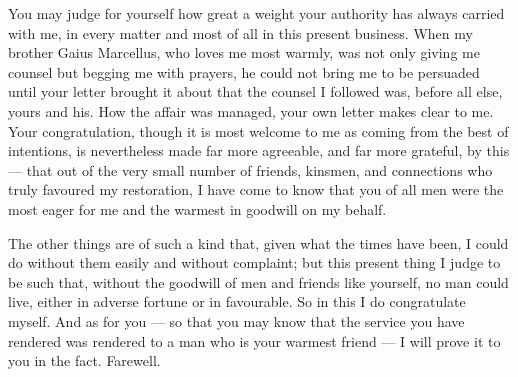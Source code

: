 

 You may judge for yourself how great a weight your authority has always carried with me, in every matter and most of all in this present business. When my brother Gaius Marcellus, who loves me most warmly, was not only giving me counsel but begging me with prayers, he could not bring me to be persuaded until your letter brought it about that the counsel I followed was, before all else, yours and his. How the affair was managed, your own letter makes clear to me. Your congratulation, though it is most welcome to me as coming from the best of intentions, is nevertheless made far more agreeable, and far more grateful, by this --- that out of the very small number of friends, kinsmen, and connections who truly favoured my restoration, I have come to know that you of all men were the most eager for me and the warmest in goodwill on my behalf.

 The other things are of such a kind that, given what the times have been, I could do without them easily and without complaint; but this present thing I judge to be such that, without the goodwill of men and friends like yourself, no man could live, either in adverse fortune or in favourable. So in this I do congratulate myself. And as for you --- so that you may know that the service you have rendered was rendered to a man who is your warmest friend --- I will prove it to you in the fact. Farewell.
